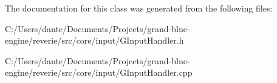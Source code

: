 The documentation for this class was generated from the following files\+:\begin{DoxyCompactItemize}
\item 
C\+:/\+Users/dante/\+Documents/\+Projects/grand-\/blue-\/engine/reverie/src/core/input/G\+Input\+Handler.\+h\item 
C\+:/\+Users/dante/\+Documents/\+Projects/grand-\/blue-\/engine/reverie/src/core/input/G\+Input\+Handler.\+cpp\end{DoxyCompactItemize}
